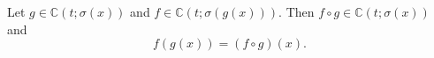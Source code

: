 Let $g \in \mathbb{C}(t; \sigma(x))$ and $f \in \mathbb{C}(t; \sigma(g(x)))$. Then $f \circ g \in \mathbb{C}(t; \sigma(x))$ and
$$f(g(x)) = (f \circ g)(x).$$

